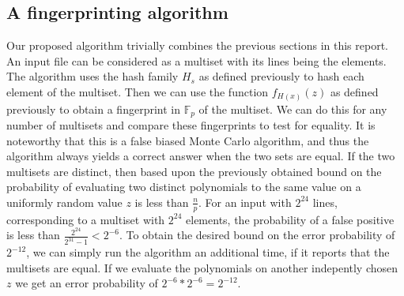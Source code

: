 \documentclass[article,a4paper,oneside]{article}
\newcommand{\+}[1]{\ensuremath{\boldsymbol{#1}}}
\begin{document}
\subsection*{A fingerprinting algorithm}
Our proposed algorithm trivially combines the previous sections in this report.
An input file can be considered as a multiset with its lines being the elements.
The algorithm uses the hash family $H_s$ as defined previously to hash each element of the multiset. Then we can use the function $f_{H(x)}(z)$ as defined previously to obtain a fingerprint in $\mathbb{F}_p$ of the multiset.
We can do this for any number of multisets and compare these fingerprints to test for equality.
It is noteworthy that this is a false biased Monte Carlo algorithm, and thus the algorithm always yields a correct answer when the two sets are equal.
If the two multisets are distinct, then based upon the previously obtained bound on the probability of evaluating two distinct polynomials to the same value on a uniformly random value $z$ is less than $\frac{n}{p}$.
For an input with $2^{24}$ lines, corresponding to a multiset with $2^{24}$ elements, the probability of a false positive is less than $\frac{2^{24}}{2^{31}-1} < 2^{-6}$. To obtain the desired bound on the error probability of $2^{-12}$, we can simply run the algorithm an additional time, if it reports that the multisets are equal. If we evaluate the polynomials on another indepently chosen $z$ we get an error probability of $2^{-6}*2^{-6} = 2^{-12}$.
\end{document}
